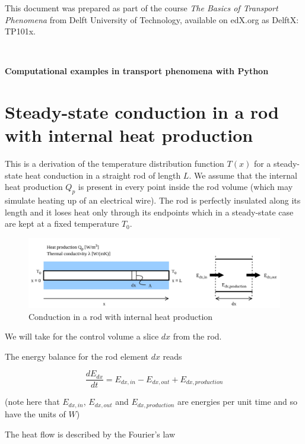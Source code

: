 \documentclass[10pt]{article}
\begin{document}
\setlength{\parskip}{0.6em}
\setlength{\parindent}{0cm}

This document was prepared as part of the course \textit{The Basics of Transport Phenomena} from Delft University of Technology, available on edX.org as DelftX: TP101x.

\,\,\,

\huge\textbf{Computational examples in transport phenomena with Python}

\normalsize

\section{Steady-state conduction in a rod with internal heat production}

This is a derivation of the temperature distribution function $T(x)$ for a steady-state heat conduction in a straight rod of length $L$. We assume that the internal heat production $Q_p$ is present in every point inside the rod volume (which may simulate heating up of an electrical wire). The rod is perfectly insulated along its length and it loses heat only through its endpoints which in a steady-state case are kept at a fixed temperature $T_0$.

\begin{figure}[H]
\centering\includegraphics[width=16cm]{conduction_rod.jpg}
\caption{Conduction in a rod with internal heat production}
\label{fig:conduction}
\end{figure}

We will take for the control volume a slice $dx$ from the rod. 

The energy balance for the rod element $dx$ reads

\begin{equation}
\frac{dE_{dx}}{dt} = E_{dx, in} - E_{dx, out} + E_{dx, production}
\end{equation}

(note here that $E_{dx, in}$, $E_{dx, out}$ and $E_{dx, production}$ are energies per unit time and so have the units of $W$)

The heat flow is described by the Fourier's law
\end{document}
